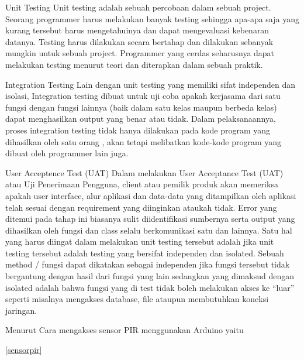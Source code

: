 Unit Testing
Unit testing adalah sebuah percobaan dalam sebuah project. Seorang programmer harus melakukan banyak testing sehingga apa-apa saja yang kurang tersebut harus mengetahuinya dan dapat mengevaluasi kebenaran datanya. Testing harus dilakukan secara bertahap dan dilakukan sebanyak mungkin untuk sebuah project. Programmer yang cerdas seharusnya dapat melakukan testing menurut teori dan diterapkan dalam sebuah praktik.
 
Integration Testing
Lain dengan unit testing yang memiliki sifat independen dan isolasi, Integration testing dibuat untuk uji coba apakah kerjasama dari satu fungsi dengan fungsi lainnya (baik dalam satu kelas maupun berbeda kelas) dapat menghasilkan output yang benar atau tidak. Dalam pelaksanaannya, proses integration testing tidak hanya dilakukan pada kode program yang dihasilkan oleh satu orang , akan tetapi melibatkan  kode-kode program yang dibuat oleh programmer lain juga.

User Acceptence Test (UAT)
Dalam melakukan User Acceptance Test (UAT) atau Uji Penerimaan Pengguna, client atau pemilik produk akan memeriksa apakah user interface, alur aplikasi dan data-data yang ditampilkan oleh aplikasi telah sesuai dengan requirement yang diinginkan ataukah tidak. Error yang ditemui pada tahap ini biasanya sulit diidentifikasi sumbernya serta output yang dihasilkan oleh fungsi dan class selalu berkomunikasi satu dan lainnya.
Satu hal yang harus diingat dalam melakukan unit testing tersebut adalah jika unit testing tersebut adalah testing yang bersifat independen dan isolated. Sebuah method / fungsi dapat dikatakan sebagai independen jika fungsi tersebut tidak bergantung dengan hasil dari fungsi yang lain sedangkan yang dimaksud dengan isolated adalah bahwa fungsi yang di test tidak boleh melakukan akses ke “luar” seperti misalnya mengakses database, file ataupun membutuhkan koneksi jaringan.


Menurut \cite{gifson2009sistem} Cara mengakses sensor PIR menggunakan Arduino yaitu

\ref{sensorpir}

